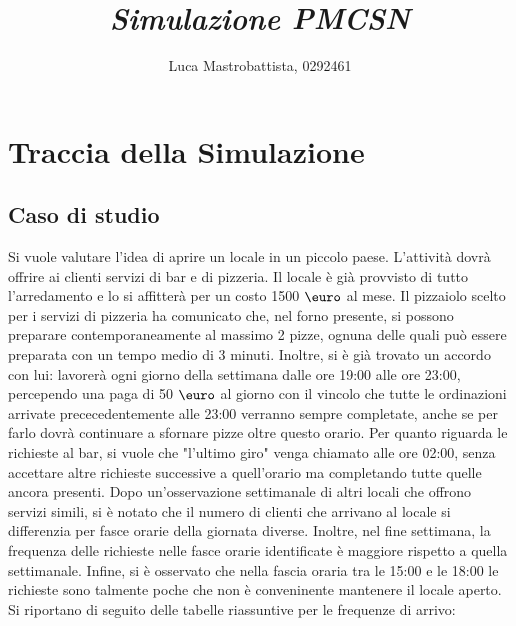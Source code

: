 \documentclass[a4paper, 12pt]{article}
\begin{document}
\title{
    \textbf{    
        \emph{Simulazione PMCSN}
    }
}
\author{Luca Mastrobattista, 0292461}
\date{} %
\maketitle  



\tableofcontents

\newpage
\section{Traccia della Simulazione}
\subsection{Caso di studio}
Si vuole valutare l'idea di aprire un locale in un piccolo paese. L'attività dovrà offrire ai clienti servizi di bar e di pizzeria. Il locale è già provvisto di tutto l'arredamento e lo si affitterà per un costo 1500 $\mbox{\euro}$ al mese. Il pizzaiolo scelto per i servizi di pizzeria ha comunicato che, nel forno presente, si possono preparare contemporaneamente al massimo 2 pizze, ognuna delle quali può essere preparata con un tempo medio di 3 minuti. Inoltre, si è già trovato un accordo con lui: lavorerà ogni giorno della settimana dalle ore 19:00 alle ore 23:00, percependo una paga di 50 $\mbox{\euro}$ al giorno con il vincolo che tutte le ordinazioni arrivate prececedentemente alle 23:00 
verranno sempre completate, anche se per farlo dovrà continuare a sfornare pizze oltre questo orario. Per quanto riguarda le richieste al bar, si vuole che "l'ultimo giro" venga chiamato alle ore 02:00, senza accettare altre richieste successive a quell'orario ma completando tutte quelle ancora presenti. \newline
Dopo un'osservazione settimanale di altri locali che offrono servizi simili, si è notato che il numero di clienti che arrivano al locale si differenzia per fasce orarie della giornata diverse. Inoltre, nel fine settimana, la frequenza delle richieste nelle fasce orarie identificate è maggiore rispetto a quella settimanale. Infine, si è osservato che nella fascia oraria tra le 15:00 e le 18:00 le richieste sono talmente poche che non è conveninente mantenere il locale aperto. Si riportano di seguito delle tabelle riassuntive per le frequenze di arrivo:
\end{document}
